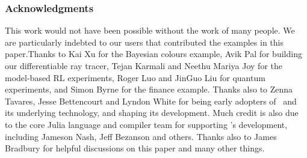 \documentclass{juliacon}
\newcommand{\Zygote}{\iftoggle{anonymous}{$\partial$P.jl}{Zygote}}
\begin{document}
\subsubsection*{Acknowledgments}

This work would not have been possible without the work of many people. We are particularly indebted to our users that contributed the examples in this paper.Thanks to Kai Xu for the Bayesian colours example, Avik Pal for building our differentiable ray tracer, Tejan Karmali and Neethu Mariya Joy for the model-based RL experiments, Roger Luo and JinGuo Liu for quantum experiments, and Simon Byrne for the finance example. Thanks also to Zenna Tavares, Jesse Bettencourt and Lyndon White for being early adopters of \Zygote\ and its underlying technology, and shaping its development. Much credit is also due to the core Julia language and compiler team for supporting \Zygote's development, including Jameson Nash, Jeff Bezanson and others. Thanks also to James Bradbury for helpful discussions on this paper and many other things.



\end{document}
